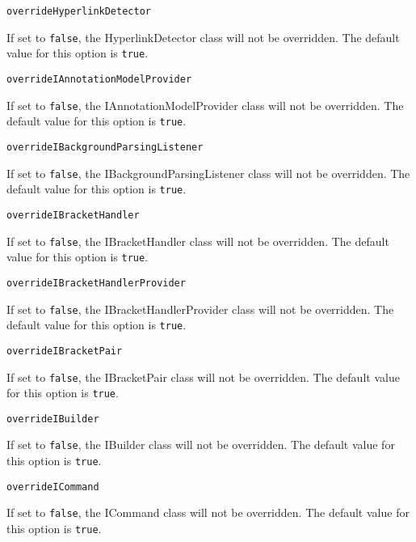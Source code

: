 \noindent\texttt{overrideHyperlinkDetector}
\begin{myindentpar}{1cm}
If set to \texttt{false}, the HyperlinkDetector class will not be overridden. The default value for this option is \texttt{true}.
\end{myindentpar}

\noindent\texttt{overrideIAnnotationModelProvider}
\begin{myindentpar}{1cm}
If set to \texttt{false}, the IAnnotationModelProvider class will not be overridden. The default value for this option is \texttt{true}.
\end{myindentpar}

\noindent\texttt{overrideIBackgroundParsingListener}
\begin{myindentpar}{1cm}
If set to \texttt{false}, the IBackgroundParsingListener class will not be overridden. The default value for this option is \texttt{true}.
\end{myindentpar}

\noindent\texttt{overrideIBracketHandler}
\begin{myindentpar}{1cm}
If set to \texttt{false}, the IBracketHandler class will not be overridden. The default value for this option is \texttt{true}.
\end{myindentpar}

\noindent\texttt{overrideIBracketHandlerProvider}
\begin{myindentpar}{1cm}
If set to \texttt{false}, the IBracketHandlerProvider class will not be overridden. The default value for this option is \texttt{true}.
\end{myindentpar}

\noindent\texttt{overrideIBracketPair}
\begin{myindentpar}{1cm}
If set to \texttt{false}, the IBracketPair class will not be overridden. The default value for this option is \texttt{true}.
\end{myindentpar}

\noindent\texttt{overrideIBuilder}
\begin{myindentpar}{1cm}
If set to \texttt{false}, the IBuilder class will not be overridden. The default value for this option is \texttt{true}.
\end{myindentpar}

\noindent\texttt{overrideICommand}
\begin{myindentpar}{1cm}
If set to \texttt{false}, the ICommand class will not be overridden. The default value for this option is \texttt{true}.
\end{myindentpar}

